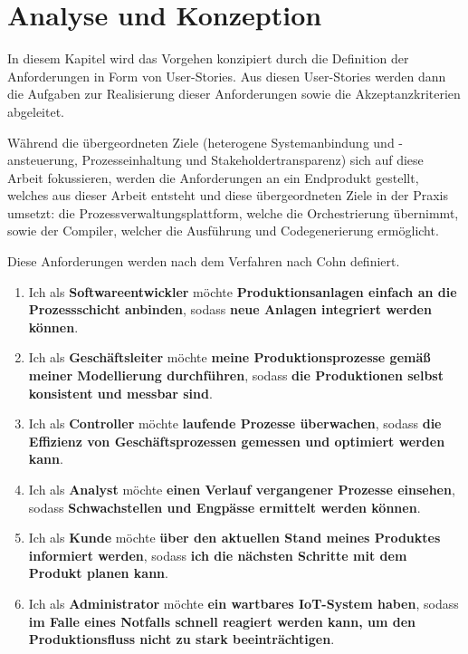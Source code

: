 \chapter{Analyse und Konzeption}
\label{analyse-und-konzeption}

In diesem Kapitel wird das Vorgehen konzipiert durch die Definition der Anforderungen in Form von User-Stories. Aus diesen User-Stories werden dann die Aufgaben zur Realisierung dieser Anforderungen sowie die Akzeptanzkriterien abgeleitet.

\noindent Während die übergeordneten Ziele (heterogene Systemanbindung und -ansteuerung, Prozesseinhaltung und Stakeholdertransparenz) sich auf diese Arbeit fokussieren, werden die Anforderungen an ein Endprodukt gestellt, welches aus dieser Arbeit entsteht und diese übergeordneten Ziele in der Praxis umsetzt: die Prozessverwaltungsplattform, welche die Orchestrierung übernimmt, sowie der Compiler, welcher die Ausführung und
Codegenerierung ermöglicht.

\noindent Diese Anforderungen werden nach dem Verfahren nach Cohn \cite{cohn_user_2004} definiert.
\label{requirements}

\begin{enumerate}[label=\Alph*)]
    \item Ich als \textbf{Softwareentwickler} möchte \textbf{Produktionsanlagen einfach an die Prozessschicht anbinden},
    sodass \textbf{neue Anlagen integriert werden können}.

    \item Ich als \textbf{Geschäftsleiter} möchte \textbf{meine Produktionsprozesse gemäß meiner Modellierung durchführen},
    sodass \textbf{die Produktionen selbst konsistent und messbar sind}.

    \item Ich als \textbf{Controller} möchte \textbf{laufende Prozesse überwachen}, sodass \textbf{die Effizienz von Geschäftsprozessen 
    gemessen und optimiert werden kann}.

    \item Ich als \textbf{Analyst} möchte \textbf{einen Verlauf vergangener Prozesse einsehen}, sodass \textbf{Schwachstellen und Engpässe
    ermittelt werden können}.

    \item Ich als \textbf{Kunde} möchte \textbf{über den aktuellen Stand meines Produktes informiert werden}, sodass \textbf{ich die nächsten
    Schritte mit dem Produkt planen kann}.

    \item Ich als \textbf{Administrator} möchte \textbf{ein wartbares IoT-System haben}, sodass \textbf{im Falle eines Notfalls schnell reagiert
    werden kann, um den Produktionsfluss nicht zu stark beeinträchtigen}.
\end{enumerate}

